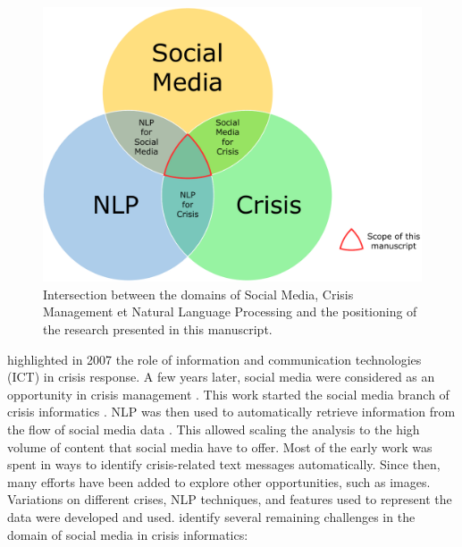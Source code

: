 \begin{figure}[htb]
    \centering
    \includegraphics[width=\textwidth]{figures/chap-1/venn-diagram-domains.pdf}
    \caption{Intersection between the domains of Social Media, Crisis Management et Natural Language Processing and the positioning of the research presented in this manuscript.}
    \label{context:venn-diagram-domains}
\end{figure}

\textcite{palenCitizenCommunicationsCrisis2007} highlighted in 2007 the role of information and communication technologies (ICT) in crisis response.
A few years later, social media were considered as an opportunity in crisis management \parencite{viewegMicrobloggingTwoNatural2010}.
This work started the social media branch of crisis informatics \parencite{palenCrisisInformaticsHumancentered2020}.
NLP was then used to automatically retrieve information from the flow of social media data \parencite{vermaNaturalLanguageProcessing2011,carageaClassifyingTextMessages2011}.
This allowed scaling the analysis to the high volume of content that social media have to offer.
Most of the early work was spent in ways to identify crisis-related text messages automatically.
Since then, many efforts have been added to explore other opportunities, such as images.
Variations on different crises, NLP techniques, and features used to represent the data were developed and used.
\textcite{imranUsingAISocial2020} identify several remaining challenges in the domain of social media in crisis informatics:

